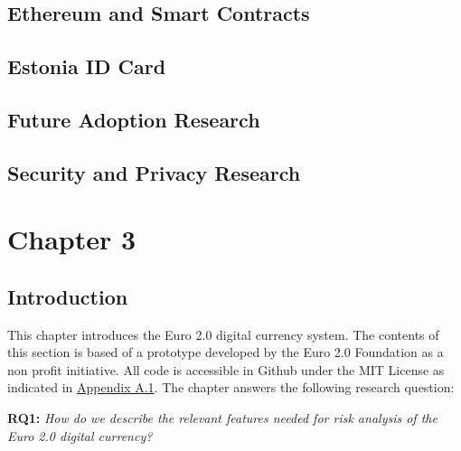 \documentclass[12pt]{article} %
\begin{document}
\subsection{Ethereum and Smart Contracts}

\subsection{Estonia ID Card}

\subsection{Future Adoption Research}

\subsection{Security and Privacy Research}

\pagebreak

\section{Chapter 3} \label{sec:3}

\subsection{Introduction} \label{ssec:3.1}
This chapter introduces the Euro 2.0 digital currency system. The contents of this section is based of a prototype developed by the Euro 2.0 Foundation as a non profit initiative. All code is accessible in Github under the MIT License as indicated in \hyperref[ssec:a.1]{Appendix A.1}. The chapter answers the following research question:

\begin{quoting}
\textbf{RQ1:} \textit{How do we describe the relevant features needed for risk analysis of the Euro 2.0 digital currency?}
\end{quoting}
\end{document}
